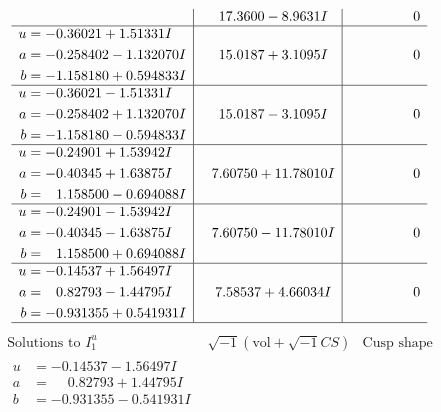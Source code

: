 \documentclass[1p]{elsarticle_modified}
\theoremstyle{definition}
\newcommand{\I}{\sqrt{-1}}
\begin{document}
$$\begin{array}{c|c|c}
 & \phantom{-}17.3600 - 8.9631 I & \phantom{-0.000000 } 0 \\ \hline\begin{aligned}
u &= -0.36021 + 1.51331 I \\
a &= -0.258402 - 1.132070 I \\
b &= -1.158180 + 0.594833 I\end{aligned}
 & \phantom{-}15.0187 + 3.1095 I & \phantom{-0.000000 } 0 \\ \hline\begin{aligned}
u &= -0.36021 - 1.51331 I \\
a &= -0.258402 + 1.132070 I \\
b &= -1.158180 - 0.594833 I\end{aligned}
 & \phantom{-}15.0187 - 3.1095 I & \phantom{-0.000000 } 0 \\ \hline\begin{aligned}
u &= -0.24901 + 1.53942 I \\
a &= -0.40345 + 1.63875 I \\
b &= \phantom{-}1.158500 - 0.694088 I\end{aligned}
 & \phantom{-}7.60750 + 11.78010 I & \phantom{-0.000000 } 0 \\ \hline\begin{aligned}
u &= -0.24901 - 1.53942 I \\
a &= -0.40345 - 1.63875 I \\
b &= \phantom{-}1.158500 + 0.694088 I\end{aligned}
 & \phantom{-}7.60750 - 11.78010 I & \phantom{-0.000000 } 0 \\ \hline\begin{aligned}
u &= -0.14537 + 1.56497 I \\
a &= \phantom{-}0.82793 - 1.44795 I \\
b &= -0.931355 + 0.541931 I\end{aligned}
 & \phantom{-}7.58537 + 4.66034 I & \phantom{-0.000000 } 0\\
 \hline 
 \end{array}$$\newpage$$\begin{array}{c|c|c}  
\text{Solutions to }I^u_{1}& \I (\text{vol} + \sqrt{-1}CS) & \text{Cusp shape}\\
 \hline 
\begin{aligned}
u &= -0.14537 - 1.56497 I \\
a &= \phantom{-}0.82793 + 1.44795 I \\
b &= -0.931355 - 0.541931 I\end{aligned}

\end{array}$$
\end{document}
